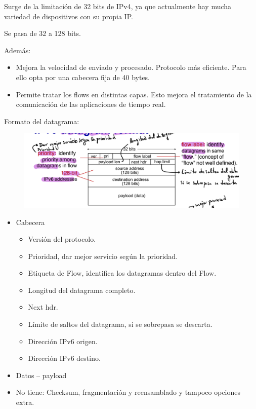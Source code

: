 \documentclass[12pt, twoside, openright]{report} %
\begin{document}
  Surge de la limitación de 32 bits de IPv4, ya que actualmente hay
  mucha variedad de dispositivos con su propia IP.

  Se pasa de 32 a 128 bits.

  Además:

  \begin{itemize}
  \item
    Mejora la velocidad de enviado y procesado. Protocolo más eficiente.
    Para ello opta por una cabecera fija de 40 bytes.
  \item
    Permite tratar los flows en distintas capas. Esto mejora el
    tratamiento de la comunicación de las aplicaciones de tiempo real.
  \end{itemize}

  Formato del datagrama:
  \begin{figure}[H]
	{\includegraphics[scale=.3]{Untitled 36.png}}
\end{figure}
\pagebreak
  \begin{itemize}
  \item
    Cabecera

    \begin{itemize}
    \item
      Versión del protocolo.
    \item
      Prioridad, dar mejor servicio según la prioridad.
    \item
      Etiqueta de Flow, identifica los datagramas dentro del Flow.
    \item
      Longitud del datagrama completo.
    \item
      Next hdr.
    \item
      Límite de saltos del datagrama, si se sobrepasa se descarta.
    \item
      Dirección IPv6 origen.
    \item
      Dirección IPv6 destino.
    \end{itemize}
  \item
    Datos -- payload
  \item
    No tiene: Checksum, fragmentación y reensamblado y tampoco opciones
    extra.
\end{itemize}
\end{document}
